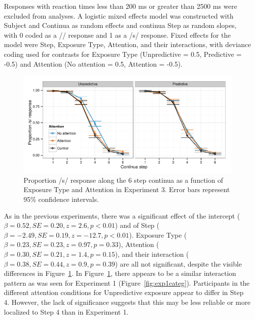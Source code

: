 Responses with reaction times less than 200 ms or greater than 2500 ms were excluded from analyses. 
A logistic mixed effects model was constructed with Subject and Continua as random effects and continua Step as random slopes, with 0 coded as a /\textesh/ response and 1 as a /s/ response.  Fixed effects for the model were Step, Exposure Type, Attention, and their interactions, with deviance coding used for contrasts for Exposure Type (Unpredictive = 0.5, Predictive = -0.5) and Attention (No attention = 0.5, Attention = -0.5).


\begin{figure}[!ht]
\caption{Proportion /s/ response along the 6 step continua as a function of Exposure Type and Attention in Experiment 3.  Error bars represent 95\% confidence intervals.}
\label{fig:exp3categ}
\begin{center}
\includegraphics[width=\textwidth]{graphs/exp3_categresults}
\end{center}
\end{figure}

As in the previous experiments, there was a significant effect of the intercept ($\beta = 0.52, SE = 0.20, z = 2.6, p < 0.01$) and of Step ($\beta = -2.49, SE = 0.19, z = -12.7, p < 0.01$).
Exposure Type ($\beta = 0.23, SE = 0.23, z = 0.97, p = 0.33$), Attention ($\beta = 0.30, SE = 0.21, z = 1.4, p = 0.15$), and their interaction ($\beta = 0.38, SE = 0.44, z = 0.9, p = 0.39$) are all not significant, despite the visible differences in Figure~\ref{fig:exp3categ}.
In Figure~\ref{fig:exp3categ}, there appears to be a similar interaction pattern as was seen for Experiment 1 (Figure~\ref{fig:exp1categ}).
Participants in the different attention conditions for Unpredictive exposure appear to differ in Step 4.
However, the lack of significance suggests that this may be less reliable or more localized to Step 4 than in Experiment 1.

